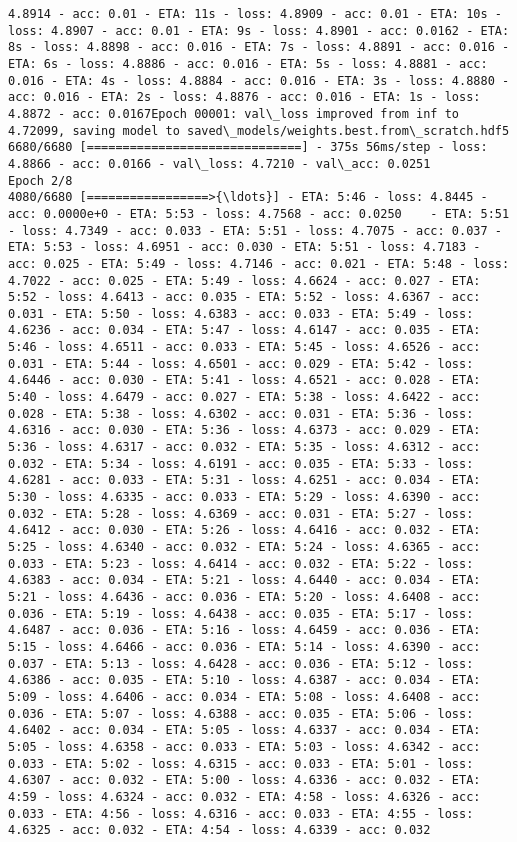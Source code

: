 \documentclass[11pt]{article}
\begin{document}
\begin{Verbatim}[commandchars=\\\{\}]
4.8914 - acc: 0.01 - ETA: 11s - loss: 4.8909 - acc: 0.01 - ETA: 10s - loss: 4.8907 - acc: 0.01 - ETA: 9s - loss: 4.8901 - acc: 0.0162 - ETA: 8s - loss: 4.8898 - acc: 0.016 - ETA: 7s - loss: 4.8891 - acc: 0.016 - ETA: 6s - loss: 4.8886 - acc: 0.016 - ETA: 5s - loss: 4.8881 - acc: 0.016 - ETA: 4s - loss: 4.8884 - acc: 0.016 - ETA: 3s - loss: 4.8880 - acc: 0.016 - ETA: 2s - loss: 4.8876 - acc: 0.016 - ETA: 1s - loss: 4.8872 - acc: 0.0167Epoch 00001: val\_loss improved from inf to 4.72099, saving model to saved\_models/weights.best.from\_scratch.hdf5
6680/6680 [==============================] - 375s 56ms/step - loss: 4.8866 - acc: 0.0166 - val\_loss: 4.7210 - val\_acc: 0.0251
Epoch 2/8
4080/6680 [=================>{\ldots}] - ETA: 5:46 - loss: 4.8445 - acc: 0.0000e+0 - ETA: 5:53 - loss: 4.7568 - acc: 0.0250    - ETA: 5:51 - loss: 4.7349 - acc: 0.033 - ETA: 5:51 - loss: 4.7075 - acc: 0.037 - ETA: 5:53 - loss: 4.6951 - acc: 0.030 - ETA: 5:51 - loss: 4.7183 - acc: 0.025 - ETA: 5:49 - loss: 4.7146 - acc: 0.021 - ETA: 5:48 - loss: 4.7022 - acc: 0.025 - ETA: 5:49 - loss: 4.6624 - acc: 0.027 - ETA: 5:52 - loss: 4.6413 - acc: 0.035 - ETA: 5:52 - loss: 4.6367 - acc: 0.031 - ETA: 5:50 - loss: 4.6383 - acc: 0.033 - ETA: 5:49 - loss: 4.6236 - acc: 0.034 - ETA: 5:47 - loss: 4.6147 - acc: 0.035 - ETA: 5:46 - loss: 4.6511 - acc: 0.033 - ETA: 5:45 - loss: 4.6526 - acc: 0.031 - ETA: 5:44 - loss: 4.6501 - acc: 0.029 - ETA: 5:42 - loss: 4.6446 - acc: 0.030 - ETA: 5:41 - loss: 4.6521 - acc: 0.028 - ETA: 5:40 - loss: 4.6479 - acc: 0.027 - ETA: 5:38 - loss: 4.6422 - acc: 0.028 - ETA: 5:38 - loss: 4.6302 - acc: 0.031 - ETA: 5:36 - loss: 4.6316 - acc: 0.030 - ETA: 5:36 - loss: 4.6373 - acc: 0.029 - ETA: 5:36 - loss: 4.6317 - acc: 0.032 - ETA: 5:35 - loss: 4.6312 - acc: 0.032 - ETA: 5:34 - loss: 4.6191 - acc: 0.035 - ETA: 5:33 - loss: 4.6281 - acc: 0.033 - ETA: 5:31 - loss: 4.6251 - acc: 0.034 - ETA: 5:30 - loss: 4.6335 - acc: 0.033 - ETA: 5:29 - loss: 4.6390 - acc: 0.032 - ETA: 5:28 - loss: 4.6369 - acc: 0.031 - ETA: 5:27 - loss: 4.6412 - acc: 0.030 - ETA: 5:26 - loss: 4.6416 - acc: 0.032 - ETA: 5:25 - loss: 4.6340 - acc: 0.032 - ETA: 5:24 - loss: 4.6365 - acc: 0.033 - ETA: 5:23 - loss: 4.6414 - acc: 0.032 - ETA: 5:22 - loss: 4.6383 - acc: 0.034 - ETA: 5:21 - loss: 4.6440 - acc: 0.034 - ETA: 5:21 - loss: 4.6436 - acc: 0.036 - ETA: 5:20 - loss: 4.6408 - acc: 0.036 - ETA: 5:19 - loss: 4.6438 - acc: 0.035 - ETA: 5:17 - loss: 4.6487 - acc: 0.036 - ETA: 5:16 - loss: 4.6459 - acc: 0.036 - ETA: 5:15 - loss: 4.6466 - acc: 0.036 - ETA: 5:14 - loss: 4.6390 - acc: 0.037 - ETA: 5:13 - loss: 4.6428 - acc: 0.036 - ETA: 5:12 - loss: 4.6386 - acc: 0.035 - ETA: 5:10 - loss: 4.6387 - acc: 0.034 - ETA: 5:09 - loss: 4.6406 - acc: 0.034 - ETA: 5:08 - loss: 4.6408 - acc: 0.036 - ETA: 5:07 - loss: 4.6388 - acc: 0.035 - ETA: 5:06 - loss: 4.6402 - acc: 0.034 - ETA: 5:05 - loss: 4.6337 - acc: 0.034 - ETA: 5:05 - loss: 4.6358 - acc: 0.033 - ETA: 5:03 - loss: 4.6342 - acc: 0.033 - ETA: 5:02 - loss: 4.6315 - acc: 0.033 - ETA: 5:01 - loss: 4.6307 - acc: 0.032 - ETA: 5:00 - loss: 4.6336 - acc: 0.032 - ETA: 4:59 - loss: 4.6324 - acc: 0.032 - ETA: 4:58 - loss: 4.6326 - acc: 0.033 - ETA: 4:56 - loss: 4.6316 - acc: 0.033 - ETA: 4:55 - loss: 4.6325 - acc: 0.032 - ETA: 4:54 - loss: 4.6339 - acc: 0.032 
\end{Verbatim}
\end{document}
